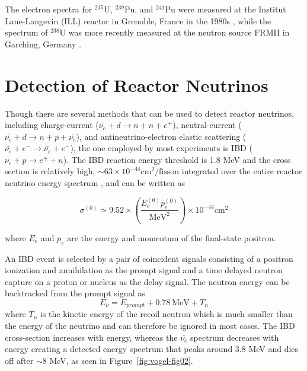 The electron spectra for $^{235}$U, $^{239}$Pu, and $^{241}$Pu were measured at the Institut
Laue-Langevin (ILL) reactor in Grenoble, France in the 1980s \cite{VonFeilitzsch:1982jw,Schreckenbach:1985ep,Hahn:1989zr}, while the spectrum of $^{238}$U was more recently measured at the neutron source FRMII in Garching, Germany \cite{Haag:2013raa}.



\section{Detection of Reactor Neutrinos}

Though there are several methods that can be used to detect reactor neutrinos, including charge-current ($\bar{\nu_e} + d \rightarrow n + n + e^+$), neutral-current ($\bar{\nu_e} + d \rightarrow n + p + \bar{\nu_e}$), and antineutrino-electron elastic scattering ($\bar{\nu_e} + e^- \rightarrow \bar{\nu_e} + e^-$), the one employed by most experiments is IBD ($\bar{\nu_e} + p \rightarrow e^+ + n$).
The IBD reaction energy threshold is 1.8 MeV and the cross section is relatively high, $\sim 63 \times 10^{-44} \textrm{cm}^2/\textrm{fisson}$ integrated over the entire reactor neutrino energy spectrum \cite{Qian:2018wid}, and can be written as

\begin{equation}
	\sigma^{(0)} \simeq 9.52 \times \left(\frac{E_e^{(0)}p_e^{(0)}}{\textrm{MeV}^2}\right) \times 10^{-44}\textrm{cm}^2
\end{equation}

where $E_e$ and $p_e$ are the energy and momentum of the final-state positron. 

An IBD event is selected by a pair of coincident signals consisting of a positron ionization and annihilation as the prompt signal and a time delayed neutron capture on a proton or nucleus as the delay signal. 
The neutron energy can be backtracked from the prompt signal as
\begin{equation}	
	E_{\bar{\nu}} = E_{prompt} + 0.78~\textrm{MeV} + T_n
\end{equation}
where $T_n$ is the kinetic energy of the recoil neutron which is much smaller than the energy of the neutrino and can therefore be ignored in most cases. 
The IBD cross-section increases with energy, whereas the $\bar{\nu_{e}}$ spectrum decreases with energy creating a detected energy spectrum that peaks around 3.8 MeV and dies off after $\sim$8 MeV, as seen in Figure~\ref{fig:vogel-fig02}. 

